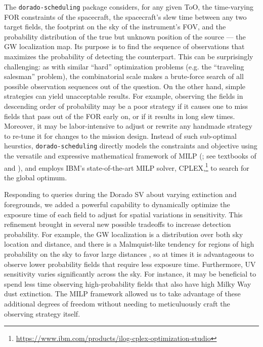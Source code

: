 \documentclass[twocolumn,times]{aastex631}
\begin{document}
The \texttt{dorado-scheduling} package considers, for any given \ac{ToO}, the time-varying \ac{FOR} constraints of the spacecraft, the spacecraft's slew time between any two target fields, the footprint on the sky of the instrument's \ac{FOV}, and the probability distribution of the true but unknown position of the source --- the \ac{GW} localization map. Its purpose is to find the sequence of observations that maximizes the probability of detecting the counterpart. This can be surprisingly challenging: as with similar ``hard'' optimization problems (e.g. the ``traveling salesman'' problem), the combinatorial scale makes a brute-force search of all possible observation sequences out of the question. On the other hand, simple strategies can yield unacceptable results. For example, observing the fields in descending order of probability may be a poor strategy if it causes one to miss fields that pass out of the \ac{FOR} early on, or if it results in long slew times. Moreover, it may be labor-intensive to adjust or rewrite any handmade strategy to re-tune it for changes to the mission design. Instead of such sub-optimal heurstics, \texttt{dorado-scheduling} directly models the constraints and objective using the versatile and expressive mathematical framework of \acl{MILP} (; see textbooks of \citealt{9781118166000} and \citealt{williams2013}), and employs IBM's state-of-the-art \ac{MILP} solver, CPLEX,\footnote{\url{https://www.ibm.com/products/ilog-cplex-optimization-studio}} to search for the global optimum.

Responding to queries during the Dorado \ac{SV} about varying extinction and foregrounds, we added a powerful capability to dynamically optimize the exposure time of each field to adjust for spatial variations in sensitivity. This refinement brought in several new possible tradeoffs to increase detection probability. For example, the \ac{GW} localization is a distribution over both sky location and distance, and there is a Malmquist-like tendency for regions of high probability on the sky to favor large distances \citep{2016ApJ...829L..15S}, so at times it is advantageous to observe lower probability fields that require less exposure time. Furthermore, \ac{UV} sensitivity varies significantly across the sky. For instance, it may be beneficial to spend less time observing high-probability fields that also have high Milky Way dust extinction. The \ac{MILP} framework allowed us to take advantage of these additional degrees of freedom without needing to meticuluously craft the observing strategy itself.
\end{document}
